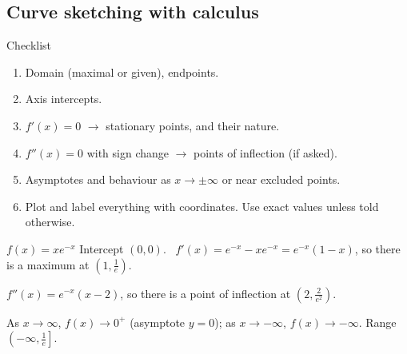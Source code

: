 \subsection{Curve sketching with calculus}
\label{sec:sketch}

\begin{cols}[0.53]
\begin{method}{Checklist}
\begin{enumerate}
  \item Domain (maximal or given), endpoints.
  \item Axis intercepts.
  \item $f'(x)=0$ $\to$ stationary points, and their nature.
  \item $f''(x)=0$ with sign change $\to$ points of inflection (if asked).
  \item Asymptotes and behaviour as $x\to\pm\infty$ or near excluded points.
  \item Plot and label everything with coordinates. Use exact values unless told otherwise.
\end{enumerate}
\end{method}
\begin{example}{$f(x)=xe^{-x}$}
Intercept $(0,0)$. \ $f'(x)=e^{-x}-xe^{-x}=e^{-x}(1-x)$, so there is a maximum at $\left(1,\frac1e\right)$.\par
$f''(x)=e^{-x}(x-2)$, so there is a point of inflection at $\left(2,\frac{2}{e^2}\right)$.\par
As $x\to\infty$, $f(x)\to0^+$ (asymptote $y=0$); as $x\to-\infty$, $f(x)\to-\infty$. Range $\left(-\infty,\frac1e\right]$.
\end{example}
\nextcol[0.445]
\centering
{}
\end{cols}


